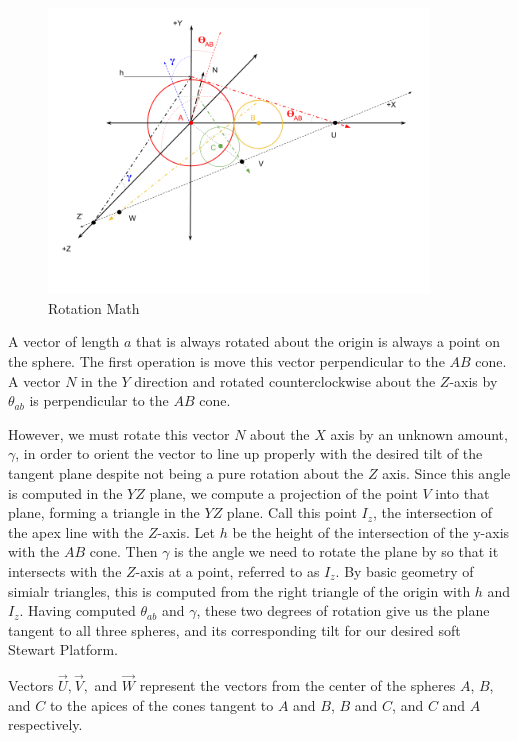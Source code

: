 \documentclass{article}
\begin{document}
\begin{figure}
     \centering
     \includegraphics[width=0.9\textwidth]{figures/RotationMath.png}
     \caption{Rotation Math}
  \label{fig:rotation}
\end{figure}

A vector of length $a$ that is always rotated about the origin is always a point on the sphere.
The first operation is move this vector perpendicular to the $AB$ cone.
A vector $N$ in the $Y$ direction and rotated counterclockwise
about the $Z$-axis by $\theta_{ab}$ is perpendicular to the $AB$ cone.

However, we must rotate this vector $N$ about the $X$ axis by an unknown amount, $\gamma$, in order
to orient the vector to line up properly with the desired tilt of the tangent plane despite not being a pure rotation about the $Z$ axis. Since this angle is computed in the $YZ$ plane, we compute a projection of the point $V$ into
that plane, forming a triangle in the $YZ$ plane.  Call this point $I_z$, the intersection
of the apex line with the $Z$-axis. Let $h$ be the height of the intersection of the y-axis with the $AB$ cone.
Then $\gamma$ is the angle we need to rotate the plane by so that it intersects with the $Z$-axis at a point, referred to as $I_z$. By basic geometry of simialr triangles, this is computed from the right triangle of the origin with $h$ and $I_z$.
Having computed $\theta_{ab}$ and $\gamma$, these two degrees of rotation give us the plane tangent to all three spheres, and its corresponding tilt for our desired soft Stewart Platform.

Vectors $\overrightarrow{U}, \overrightarrow{V}, $ and $  \overrightarrow{W}$ represent the vectors from the center of the spheres $A$, $B$, and $C$ to
the apices of the cones tangent to $A$ and $B$, $B$ and $C$, and $C$ and $A$ respectively.
\end{document}

